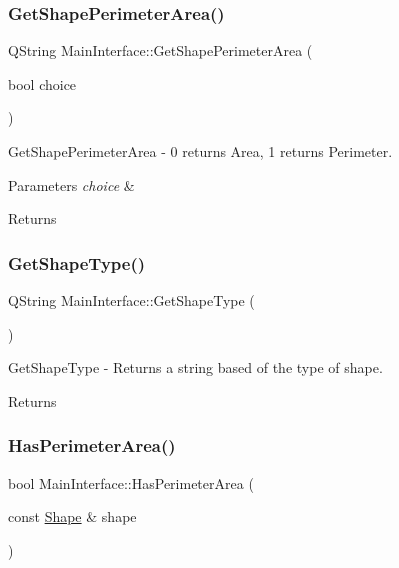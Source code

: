 \subsubsection{\texorpdfstring{Get\+Shape\+Perimeter\+Area()}{GetShapePerimeterArea()}}
{\footnotesize\ttfamily Q\+String Main\+Interface\+::\+Get\+Shape\+Perimeter\+Area (\begin{DoxyParamCaption}\item[{bool}]{choice }\end{DoxyParamCaption})}



Get\+Shape\+Perimeter\+Area -\/ 0 returns Area, 1 returns Perimeter. 


\begin{DoxyParams}{Parameters}
{\em choice} & \\
\hline
\end{DoxyParams}
\begin{DoxyReturn}{Returns}

\end{DoxyReturn}
\mbox{\label{class_main_interface_a56a79641ec2a69ce589d01d22a26d41c}} 
\subsubsection{\texorpdfstring{Get\+Shape\+Type()}{GetShapeType()}}
{\footnotesize\ttfamily Q\+String Main\+Interface\+::\+Get\+Shape\+Type (\begin{DoxyParamCaption}{ }\end{DoxyParamCaption})}



Get\+Shape\+Type -\/ Returns a string based of the type of shape. 

\begin{DoxyReturn}{Returns}

\end{DoxyReturn}
\mbox{\label{class_main_interface_a5f424dd6f675ae1b55d39c60755cd464}} 
\subsubsection{\texorpdfstring{Has\+Perimeter\+Area()}{HasPerimeterArea()}}
{\footnotesize\ttfamily bool Main\+Interface\+::\+Has\+Perimeter\+Area (\begin{DoxyParamCaption}\item[{const \hyperlink{class_shape}{Shape} \&}]{shape }\end{DoxyParamCaption})}



